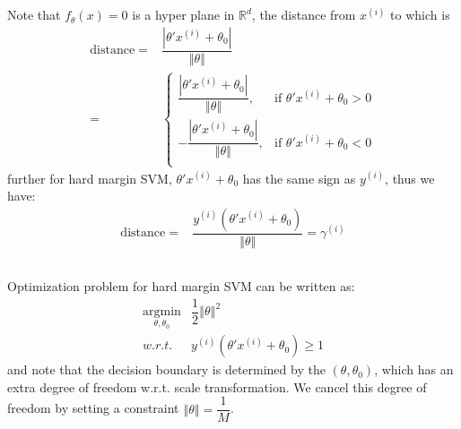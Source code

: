 \documentclass[11pt,a4paper]{ctexart}
\numberwithin{equation}{section}%
\begin{document}
\subsection{}

Note that $ f_\theta (x)=0 $ is a hyper plane in $ \mathbb{R}^d $, the distance from $ x^{(i)} $ to which is 
\begin{align*}
    \mathrm{ distance }=& \dfrac{ \left\vert \theta 'x^{(i)} +\theta _0 \right\vert   }{ \left\Vert \theta  \right\Vert } \\
    =& \begin{cases}
        \dfrac{ \left\vert \theta 'x^{(i)} +\theta _0 \right\vert   }{ \left\Vert \theta  \right\Vert } , & \text{if } \theta 'x^{(i)} +\theta _0 >0\\
        -\dfrac{ \left\vert \theta 'x^{(i)} +\theta _0 \right\vert   }{ \left\Vert \theta  \right\Vert } , & \text{if } \theta 'x^{(i)} +\theta _0 <0\\
    \end{cases}
\end{align*}
further for hard margin SVM, $ \theta 'x^{(i)} +\theta _0 $ has the same sign as $ y^{(i)} $, thus we have:
\begin{align*}
    \mathrm{ distance }=& \dfrac{ y^{(i)}(\theta 'x^{(i)} +\theta _0) }{ \left\Vert \theta  \right\Vert }= \gamma ^(i) 
\end{align*}

\subsection{}

Optimization problem for hard margin SVM can be written as:
\begin{align*}
    \mathop{ \arg\min }\limits_{\theta ,\theta _0} & \dfrac{ 1 }{ 2 }\left\Vert \theta  \right\Vert ^2 \\
    w.r.t. & y^{(i)}(\theta 'x^{(i)} +\theta _0) \geq 1  
\end{align*}
and note that the decision boundary is determined by the $ (\theta ,\theta _0) $, which has an extra degree of freedom w.r.t. scale transformation. We cancel this degree of freedom by setting a constraint $ \left\Vert \theta  \right\Vert = \dfrac{ 1 }{ M }  $.
\end{document}
